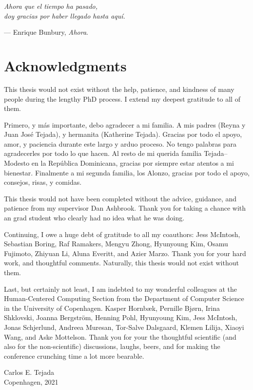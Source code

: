 
\begin{flushright}{
	\slshape
	Ahora que el tiempo ha pasado,\\ 
	doy gracias por haber llegado hasta aqu\'i.

	--- Enrique Bunbury, \emph{Ahora}.
}
\end{flushright}



\bigskip

\begingroup
	\let\clearpage\relax
	\let\cleardoublepage\relax
	\let\cleardoublepage\relax
	\chapter*{Acknowledgments}
		This thesis would not exist without the help, patience, and kindness of many
		people during the lengthy PhD process. I extend my deepest gratitude to
		all of them.

		Primero, y más importante, debo agradecer a mi familia. A mis padres (Reyna
		y Juan Jos\'e Tejada), y hermanita (Katherine Tejada). Gracias por todo el
		apoyo, amor, y paciencia durante este largo y arduo proceso. No tengo
		palabras para agradecerles por todo lo que hacen. Al resto de mi querida
		familia Tejada--Modesto en la Rep\'ublica Dominicana, gracias por siempre
		estar atentos a mi bienestar. Finalmente a mi segunda familia, los Alonzo,
		gracias por todo el apoyo, consejos, risas, y comidas.
		
		This thesis would not have been completed without the advice, guidance, and
		patience from my supervisor Dan Ashbrook. Thank you for taking a chance with
		an grad student who clearly had no idea what he was doing.

		Continuing, I owe a huge debt of gratitude to all my coauthors: Jess
		McIntosh, Sebastian Boring, Raf Ramakers, Mengyu Zhong, Hyunyoung Kim, Osamu
		Fujimoto, Zhiyuan Li, Aluna Everitt, and Azier Marzo. Thank you for your
		hard work, and thoughtful comments. Naturally, this thesis would not exist
		without them.

		Last, but certainly not least, I am indebted to my wonderful colleagues at
		the Human-Centered Computing Section from the Department of Computer Science
		in the University of Copenhagen. Kasper Hornb\ae{}k, Pernille Bjørn, Irina
		Shklovski, Joanna Bergstr\"om, Henning Pohl, Hyunyoung Kim, Jess McIntosh,
		Jonas Schjerlund, Andreea Muresan, Tor-Salve Dalsgaard, Klemen Lilija, 
		Xiaoyi Wang, and Aske Mottelson. Thank you for your the thoughtful
		scientific (and also for the non-scientific) discussions, laughs, beers, and
		for making the conference crunching time a lot more bearable.

		\vfill

		\noindent
		Carlos E. Tejada\\
		Copenhagen, 2021

\endgroup
